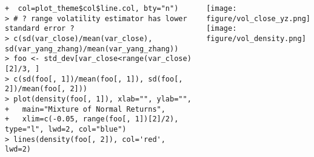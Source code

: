 \documentclass[10pt]{beamer}\usepackage[]{graphicx}\usepackage[]{color}
\makeatletter
\newenvironment{kframe}{%
 \def\at@end@of@kframe{}%
 \ifinner\ifhmode%
  \def\at@end@of@kframe{\end{minipage}}%
  \begin{minipage}{\columnwidth}%
 \fi\fi%
 \def\FrameCommand##1{\hskip\@totalleftmargin \hskip-\fboxsep
 \colorbox{shadecolor}{##1}\hskip-\fboxsep
     \hskip-\linewidth \hskip-\@totalleftmargin \hskip\columnwidth}%
 \MakeFramed {\advance\hsize-\width
   \@totalleftmargin\z@ \linewidth\hsize
   \@setminipage}}%
 {\par\unskip\endMakeFramed%
 \at@end@of@kframe}
\newenvironment{knitrout}{}{} %
\makeatother
\begin{document}
\begin{frame}[fragile,t]{\subsecname}
\begin{block}{}
\begin{columns}[T]
\begin{knitrout}
\begin{kframe}
\begin{verbatim}
+  col=plot_theme$col$line.col, bty="n")
> # ? range volatility estimator has lower standard error ?
> c(sd(var_close)/mean(var_close), sd(var_yang_zhang)/mean(var_yang_zhang))
> foo <- std_dev[var_close<range(var_close)[2]/3, ]
> c(sd(foo[, 1])/mean(foo[, 1]), sd(foo[, 2])/mean(foo[, 2]))
> plot(density(foo[, 1]), xlab="", ylab="",
+   main="Mixture of Normal Returns",
+   xlim=c(-0.05, range(foo[, 1])[2]/2), type="l", lwd=2, col="blue")
> lines(density(foo[, 2]), col='red', lwd=2)
\end{verbatim}
\end{kframe}
\end{knitrout}
    \vspace{-1em}
      \texttt{[image: figure/vol\_close\_yz.png]}\\
      \texttt{[image: figure/vol\_density.png]}
  \end{columns}
\end{block}

\end{frame}


\end{document}
